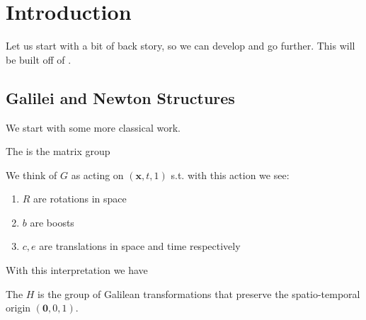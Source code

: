 \documentclass{article}
\begin{document}
\section{Introduction}

Let us start with a bit of back story, so we can develop and go further. This will be built off of \cite{Duval1985}.
\subsection{Galilei and Newton Structures}
We start with some more classical work.

\begin{definition}
The  is the matrix group
\end{definition}

We think of $G$ as acting on $(\bm{x},t,1)$ s.t. 
with this action we see:
\begin{enumerate}
	\item $R$ are rotations in space
	\item $b$ are boosts
	\item $c,e$ are translations in space and time respectively
\end{enumerate}

With this interpretation we have

\begin{definition}
	The  $H$ is the group of Galilean transformations that preserve the spatio-temporal origin $(\bm{0},0,1)$. 
\end{definition}
\end{document}
